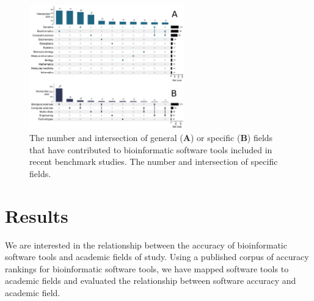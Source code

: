 \documentclass[fleqn,10pt,doc,onecolumn]{SelfArx}%
\begin{document}





\begin{figure}[ht!]
\begin{center}
  \includegraphics[width=0.6\textwidth]{upset-plots.pdf}
\end{center}
  \caption{ The number and intersection of general (\textbf{A}) or
  specific (\textbf{B}) fields that have contributed to bioinformatic
  software tools included in recent benchmark studies.  The number and
  intersection of specific fields.  }
\label{fig:fig1}
\end{figure}


\section*{Results}

We are interested in the relationship between the accuracy of
bioinformatic software tools and academic fields of study. Using a
published corpus of accuracy rankings for bioinformatic software
tools, we have mapped software tools to academic fields and evaluated
the relationship between software accuracy and academic field.
\end{document}
